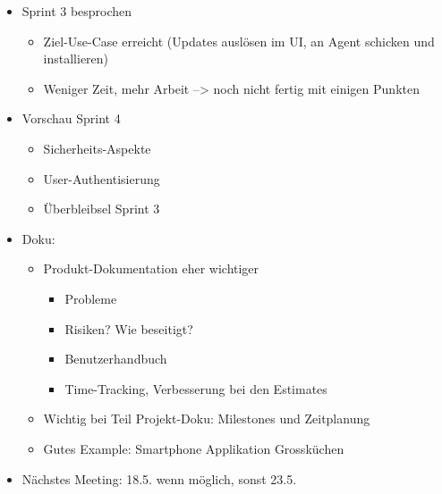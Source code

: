 \documentclass[class=scrbook,crop=false]{standalone}
\begin{document}
	\begin{itemize}
        \item Sprint 3 besprochen
        \begin{itemize}
            \item Ziel-Use-Case erreicht (Updates auslösen im UI, an Agent schicken und installieren)
            \item Weniger Zeit, mehr Arbeit --> noch nicht fertig mit einigen Punkten
        \end{itemize}
        \item Vorschau Sprint 4
        \begin{itemize}
            \item Sicherheits-Aspekte
            \item User-Authentisierung
            \item Überbleibsel Sprint 3
        \end{itemize}
        \item Doku:
        \begin{itemize}
            \item Produkt-Dokumentation eher wichtiger
            \begin{itemize}
                \item Probleme
                \item Risiken? Wie beseitigt?
                \item Benutzerhandbuch
                \item Time-Tracking, Verbesserung bei den Estimates
            \end{itemize}
            \item Wichtig bei Teil Projekt-Doku: Milestones und Zeitplanung
            \item Gutes Example: Smartphone Applikation Grossküchen
        \end{itemize}
        \item Nächstes Meeting: 18.5. wenn möglich, sonst 23.5.
    \end{itemize}
    
\end{document}

